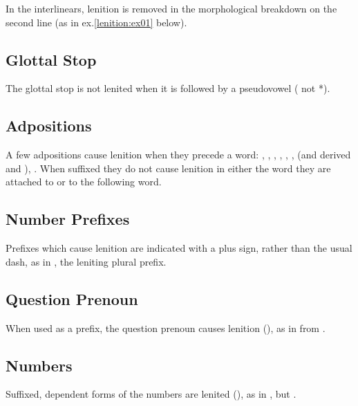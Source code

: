 \noindent In the interlinears, lenition is removed in the
morphological breakdown on the second line (as in
ex.\ref{lenition:ex01} below).

\subsection{Glottal Stop} The glottal stop is not lenited when it is
followed by a pseudovowel ( not *).
\label{l-and-s:lenition:pseudovowel}

\subsection{Adpositions} A few adpositions cause lenition when they
precede a word: , , , , , ,
 (and derived  and ), . When suffixed
they do not cause lenition in either the word they are attached to or
to the following word.

\subsection{Number Prefixes} Prefixes which cause lenition are
indicated with a plus sign, rather than the usual dash, as in ,
the leniting plural prefix. 

\subsection{Question Prenoun} When used as a prefix, the question
prenoun  causes lenition (), as
in   from  .

\subsection{Numbers}
Suffixed, dependent forms of the numbers are lenited
(), as in  ,
but  .

